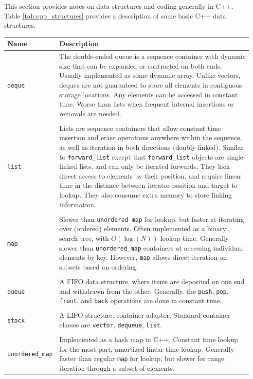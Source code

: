 This section provides notes on data structures and coding generally in C++. Table \ref{tab:cpp_structures} provides a description of some basic C++ data structures. 

 \begin{tabular}{p{}p{}}
Name & Description \\
\hline
\texttt{deque} & The double-ended queue is a sequence container with dynamic size that can be expanded or contracted on both ends. Usually implemented as some dynamic array. Unlike vectors, deques are not guaranteed to store all elements in contiguous storage locations. Any elements can be accessed in constant time. Worse than lists when frequent internal insertions or removals are needed. \\
\hfill \\
\texttt{list} & Lists are sequence containers that allow constant time insertion and erase operations anywhere within the sequence, as well as iteration in both directions (doubly-linked). Similar to \texttt{forward\_list} except that \texttt{forward\_list} objects are single-linked lists, and can only be iterated forwards. They lack direct access to elements by their position, and require linear time in the distance between iterator position and target to lookup. They also consume extra memory to store linking information. \\
\hfill \\
\texttt{map} & Slower than \texttt{unordered\_map} for lookup, but faster at iterating over (ordered) elements. Often implemented as a binary search tree, with $O(\log(N))$ lookup time. Generally slower than \texttt{unordered\_map} containers at accessing individual elements by key. However, \texttt{map} allows direct iteration on subsets based on ordering. \\
\hfill \\
\texttt{queue} & A FIFO data structure, where items are deposited on one end and withdrawn from the other. Generally, the \texttt{push}, \texttt{pop}, \texttt{front}, and \texttt{back} operations are done in constant time. \\
\hfill \\
\texttt{stack} & A LIFO structure, container adaptor. Standard container classes are \texttt{vector}, \texttt{dequeue}, \texttt{list}. \\
\hfill \\
\texttt{unordered\_map} & Implemented as a hash map in C++. Constant time lookup for the most part, amortized linear time lookup. Generally faster than regular \texttt{map} for lookup, but slower for range iteration through a subset of elements. \\

\end{tabular}
